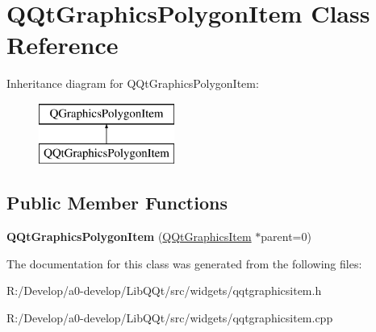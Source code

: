 \hypertarget{class_q_qt_graphics_polygon_item}{}\section{Q\+Qt\+Graphics\+Polygon\+Item Class Reference}
\label{class_q_qt_graphics_polygon_item}
Inheritance diagram for Q\+Qt\+Graphics\+Polygon\+Item\+:\begin{figure}[H]
\begin{center}
\leavevmode
\includegraphics[height=2.000000cm]{class_q_qt_graphics_polygon_item}
\end{center}
\end{figure}
\subsection*{Public Member Functions}
\begin{DoxyCompactItemize}
\item 
\mbox{\label{class_q_qt_graphics_polygon_item_a5a5fca976c7d0f78c1752b8b52043e4c}} 
{\bfseries Q\+Qt\+Graphics\+Polygon\+Item} (\mbox{\hyperlink{class_q_qt_graphics_item}{Q\+Qt\+Graphics\+Item}} $\ast$parent=0)
\end{DoxyCompactItemize}


The documentation for this class was generated from the following files\+:\begin{DoxyCompactItemize}
\item 
R\+:/\+Develop/a0-\/develop/\+Lib\+Q\+Qt/src/widgets/qqtgraphicsitem.\+h\item 
R\+:/\+Develop/a0-\/develop/\+Lib\+Q\+Qt/src/widgets/qqtgraphicsitem.\+cpp\end{DoxyCompactItemize}
